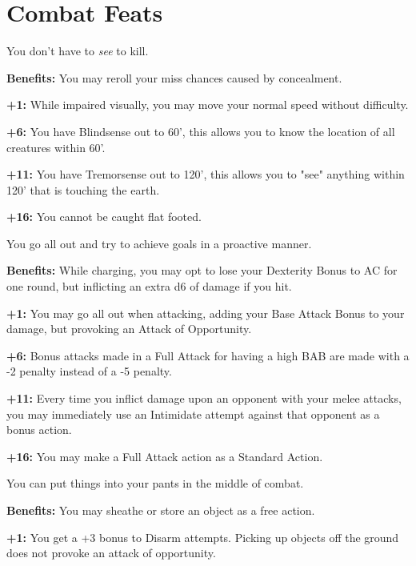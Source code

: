 \section{Combat Feats}


You don't have to \textit{see} to kill.

\textbf{Benefits:} You may reroll your miss chances caused by concealment.

\textbf{+1:} While impaired visually, you may move your normal speed without difficulty.

\textbf{+6:} You have Blindsense out to 60', this allows you to know the location of all creatures within 60'.

\textbf{+11:} You have Tremorsense out to 120', this allows you to "see" anything within 120' that is touching the earth.

\textbf{+16:} You cannot be caught flat footed.


You go all out and try to achieve goals in a proactive manner.

\textbf{Benefits:} While charging, you may opt to lose your Dexterity Bonus to AC for one round, but inflicting an extra d6 of damage if you hit.

\textbf{+1:} You may go all out when attacking, adding your Base Attack Bonus to your damage, but provoking an Attack of Opportunity.

\textbf{+6:} Bonus attacks made in a Full Attack for having a high BAB are made with a -2 penalty instead of a -5 penalty.

\textbf{+11:} Every time you inflict damage upon an opponent with your melee attacks, you may immediately use an Intimidate attempt against that opponent as a bonus action.

\textbf{+16:} You may make a Full Attack action as a Standard Action.


You can put things into your pants in the middle of combat.

\textbf{Benefits:} You may sheathe or store an object as a free action.

\textbf{+1:} You get a +3 bonus to Disarm attempts. Picking up objects off the ground does not provoke an attack of opportunity.

